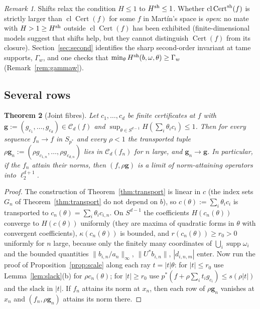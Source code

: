 \documentclass[10pt]{amsart}
\newtheorem{theorem}{Theorem}[section]
\theoremstyle{definition}
\theoremstyle{remark}
\newtheorem{remark}[theorem]{Remark}
\newcommand{\supp}{\operatorname{supp}}
\newcommand{\Cset}{\mathcal C}
\newcommand{\Cert}{\operatorname{Cert}}
\newcommand{\cl}{\operatorname{cl}}
\begin{document}
\begin{remark}\label{rem:shiftopen}
Shifts relax the condition $H\le1$ to $H^{\rm sh}\le1$.  Whether
$\cl\Cert^{\rm sh}(f)$ is strictly larger than $\cl\Cert(f)$ for some $f$ in
Mart\'in's space is \emph{open}: no mate with $H>1\ge H^{\rm sh}$ outside
$\cl\Cert(f)$ has been exhibited (finite-dimensional models suggest that
shifts help, but they cannot distinguish $\Cert(f)$ from its closure).
Section~\ref{sec:second} identifies the sharp second-order invariant at
tame supports, $\Gamma_w$, and one checks that $\min_\theta H^{\rm
sh}(b,\omega,\theta)\ge\Gamma_w$ (Remark~\ref{rem:gammaw}).
\end{remark}

\subsection{Several rows}

\begin{theorem}[Joint fibres]\label{thm:joint}
Let $c_1,\dots,c_d$ be finite certificates at $f$ with
$\mathbf g:=(g_{c_1},\dots,g_{c_d})\in\Cset_d(f)$ and
$\sup_{\theta\in S^{d-1}}H(\sum_i\theta_ic_i)\le1$.  Then for every sequence
$f_n\to f$ in $S_{p^*}$ and every $\rho<1$ the transported tuple
$\rho\mathbf g_n:=(\rho g_{c_{1,n}},\dots,\rho g_{c_{d,n}})$ lies in $\Cset_d(f_n)$
for $n$ large, and $\mathbf g_n\to\mathbf g$.  In particular, if the $f_n$ attain their
norms, then $(f,\rho\mathbf g)$ is a limit of norm-attaining operators into
$\ell_2^{d+1}$.
\end{theorem}

\begin{proof}
The construction of Theorem~\ref{thm:transport} is linear in $c$ (the index sets
$G_n$ of Theorem~\ref{thm:transport} do not depend on $b$), so $c(\theta):=\sum_i\theta_ic_i$ is
transported to $c_n(\theta)=\sum_i\theta_ic_{i,n}$.  On $S^{d-1}$ the
coefficients $H(c_n(\theta))$ converge to $H(c(\theta))$ uniformly (they
are maxima of quadratic forms in $\theta$ with convergent coefficients),
$\kappa(c_n(\theta))$ is bounded, and $r(c_n(\theta))\ge r_0>0$ uniformly
for $n$ large, because only the finitely many coordinates of
$\bigcup_i\supp\omega_i$ and the bounded quantities
$\|b_{i,n}/a_n\|_\infty$, $\|U^*b_{i,n}\|$, $|d_{i,n,m}|$ enter.  Now run
the proof of Proposition~\ref{prop:scale} along each ray $t=|t|\theta$:
for $|t|\le r_0$ use Lemma~\ref{lem:slack}(b) for $\rho c_n(\theta)$; for
$|t|\ge r_0$ use $p^*(f+\rho\sum_it_ig_{c_i})\le s(\rho|t|)$ and the slack
in $|t|$.  If $f_n$ attains its norm at $x_n$, then each row of $\rho\mathbf g_n$
vanishes at $x_n$ and $(f_n,\rho\mathbf g_n)$ attains its norm there.
\end{proof}
\end{document}
